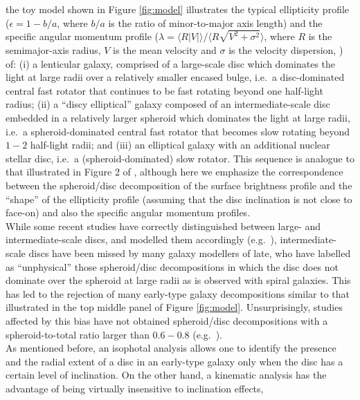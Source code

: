 \documentclass[useAMS,usenatbib,article]{mnras}
\begin{document}
the toy model shown in Figure \ref{fig:model} illustrates the typical ellipticity profile 
($\epsilon = 1 - b/a$, where $b/a$ is the ratio of minor-to-major axis length) 
and the specific angular momentum profile 
($\lambda = \langle R |V| \rangle / \langle R \sqrt{V^2 + \sigma^2} \rangle$, 
where $R$ is the semimajor-axis radius, $V$ is the mean velocity and $\sigma$ is the velocity dispersion, \citealt{emsellem2007}) 
of: 
(i) a lenticular galaxy, 
comprised of a large-scale disc which dominates the light at large radii over a relatively smaller encased bulge,  
i.e.~a disc-dominated central fast rotator that continues to be fast rotating beyond one half-light radius; 
(ii) a ``discy elliptical'' galaxy \citep{michard1984,nieto1988} 
composed of an intermediate-scale disc embedded in a relatively larger spheroid which dominates the light at large radii,
i.e.~a spheroid-dominated central fast rotator that becomes slow rotating beyond $1-2$ half-light radii; and  
(iii) an elliptical galaxy with an additional nuclear stellar disc, 
i.e.~a (spheroid-dominated) slow rotator. 
This sequence is analogue to that illustrated in Figure 2 of \cite{cappellari2011kmdr}, 
although here we emphasize the correspondence between the spheroid/disc decomposition of the surface brightness profile 
and the ``shape'' of the ellipticity profile (assuming that the disc inclination is not close to face-on) 
and also the specific angular momentum profiles. \\
While some recent studies have correctly distinguished between large- and intermediate-scale discs, 
and modelled them accordingly (e.g.~\citealt{kormendybender2012,krajnovic2013}), 
intermediate-scale discs have been missed by many galaxy modellers of late, 
who have labelled as ``unphysical'' \citep{allen2006} those spheroid/disc decompositions 
in which the disc does not dominate over the spheroid at large radii 
as is observed with spiral galaxies. 
This has led to the rejection of many early-type galaxy decompositions 
similar to that illustrated in the top middle panel of Figure \ref{fig:model}. 
Unsurprisingly, studies affected by this bias have not obtained spheroid/disc decompositions with a spheroid-to-total ratio larger than $0.6 - 0.8$ 
(e.g.~\citealt{gadotti2008,head2014,querejeta2015,mendezabreu2015}). \\
As mentioned before, an isophotal analysis allows one to identify the presence and the radial extent of a disc in an early-type galaxy 
only when the disc has a certain level of inclination. 
On the other hand, a kinematic analysis has the advantage of being virtually insensitive to inclination effects, 
\end{document}
